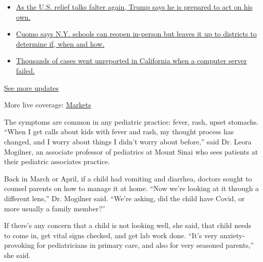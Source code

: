 \begin{itemize}
\tightlist
\item
  \href{https://www.nytimes.com/2020/08/07/world/covid-19-news.html?action=click\&pgtype=Article\&state=default\&region=MAIN_CONTENT_1\&context=storylines_live_updates\#link-1f86d03a}{As
  the U.S. relief talks falter again, Trump says he is prepared to act
  on his own.}
\item
  \href{https://www.nytimes.com/2020/08/07/world/covid-19-news.html?action=click\&pgtype=Article\&state=default\&region=MAIN_CONTENT_1\&context=storylines_live_updates\#link-3f64a70a}{Cuomo
  says N.Y. schools can reopen in-person but leaves it up to districts
  to determine if, when and how.}
\item
  \href{https://www.nytimes.com/2020/08/07/world/covid-19-news.html?action=click\&pgtype=Article\&state=default\&region=MAIN_CONTENT_1\&context=storylines_live_updates\#link-14e70066}{Thousands
  of cases went unreported in California when a computer server failed.}
\end{itemize}

\href{https://www.nytimes.com/2020/08/07/world/covid-19-news.html?action=click\&pgtype=Article\&state=default\&region=MAIN_CONTENT_1\&context=storylines_live_updates}{See
more updates}

More live coverage:
\href{https://www.nytimes.com/live/2020/08/07/business/stock-market-today-coronavirus?action=click\&pgtype=Article\&state=default\&region=MAIN_CONTENT_1\&context=storylines_live_updates}{Markets}

The symptoms are common in any pediatric practice: fever, rash, upset
stomachs. ``When I get calls about kids with fever and rash, my thought
process has changed, and I worry about things I didn't worry about
before,'' said Dr. Leora Mogilner, an associate professor of pediatrics
at Mount Sinai who sees patients at their pediatric associates practice.

Back in March or April, if a child had vomiting and diarrhea, doctors
sought to counsel parents on how to manage it at home. ``Now we're
looking at it through a different lens,'' Dr. Mogilner said. ``We're
asking, did the child have Covid, or more usually a family member?''

If there's any concern that a child is not looking well, she said, that
child needs to come in, get vital signs checked, and get lab work done.
``It's very anxiety-provoking for pediatricians in primary care, and
also for very seasoned parents,'' she said.


